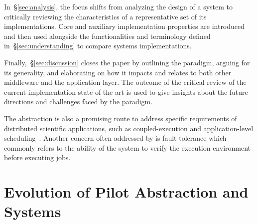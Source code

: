 \documentclass{sig-alternate}
\begin{document}
In~\S\ref{sec:analysis}, the focus shifts from analyzing the design of a
\pilotjob system to critically reviewing the characteristics of a representative
set of its implementations. Core and auxiliary implementation properties are
introduced and then used alongside the functionalities and terminology defined
in~\S\ref{sec:understanding} to compare \pilotjob systems implementations.

Finally,~\S\ref{sec:discussion} closes the paper by outlining the \pilot
paradigm, arguing for its generality, and elaborating on how it impacts and
relates to both other middleware and the application layer. The outcome of the
critical review of the current implementation state of the art is used to give
insights about the future directions and challenges faced by the \pilot
paradigm.

 The \pilotjob abstraction is also a
promising route to address specific requirements of distributed scientific
applications, such as coupled-execution and application-level
scheduling~\cite{ko-efficient,DBLP:conf/hpdc/KimHMAJ10}. Another concern often
addressed by \pilotjobs is fault tolerance which commonly refers to the ability
of the \pilotjob system to verify the execution environment before executing
jobs.

 


%
\section{Evolution of Pilot Abstraction and Systems}
\label{sec:history}


\end{document}
